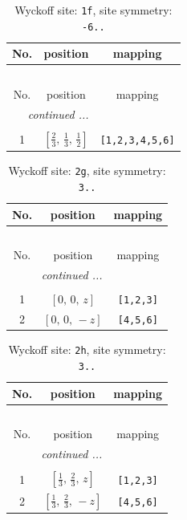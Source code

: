 \documentclass[fleqn,8pt]{jsarticle}
\begin{document}
\renewcommand{\arraystretch}{1.2}
\begin{longtable}{ccc}
\caption{Wyckoff site: {\tt 1f}, site symmetry: {\tt -6..}}
 \\
 \hline \hline
No. & position & mapping \\ \hline \endfirsthead

\multicolumn{2}{l}{\tablename\ \thetable{}} \\
 \hline \hline
No. & position & mapping \\ \hline \endhead

 \hline \hline
\multicolumn{2}{r}{\footnotesize\it continued ...} \\ \endfoot

 \hline \hline
\multicolumn{2}{r}{} \\ \endlastfoot

1 & $\left[ \frac{2}{3},\, \frac{1}{3},\, \frac{1}{2} \right]$ & {\tt [1,2,3,4,5,6]} \\
\end{longtable}
\renewcommand{\arraystretch}{1.2}
\begin{longtable}{ccc}
\caption{Wyckoff site: {\tt 2g}, site symmetry: {\tt 3..}}
 \\
 \hline \hline
No. & position & mapping \\ \hline \endfirsthead

\multicolumn{2}{l}{\tablename\ \thetable{}} \\
 \hline \hline
No. & position & mapping \\ \hline \endhead

 \hline \hline
\multicolumn{2}{r}{\footnotesize\it continued ...} \\ \endfoot

 \hline \hline
\multicolumn{2}{r}{} \\ \endlastfoot

1 & $\left[ 0,\, 0,\, z \right]$ & {\tt [1,2,3]} \\ \hline
2 & $\left[ 0,\, 0,\, - z \right]$ & {\tt [4,5,6]} \\
\end{longtable}
\renewcommand{\arraystretch}{1.2}
\begin{longtable}{ccc}
\caption{Wyckoff site: {\tt 2h}, site symmetry: {\tt 3..}}
 \\
 \hline \hline
No. & position & mapping \\ \hline \endfirsthead

\multicolumn{2}{l}{\tablename\ \thetable{}} \\
 \hline \hline
No. & position & mapping \\ \hline \endhead

 \hline \hline
\multicolumn{2}{r}{\footnotesize\it continued ...} \\ \endfoot

 \hline \hline
\multicolumn{2}{r}{} \\ \endlastfoot

1 & $\left[ \frac{1}{3},\, \frac{2}{3},\, z \right]$ & {\tt [1,2,3]} \\ \hline
2 & $\left[ \frac{1}{3},\, \frac{2}{3},\, - z \right]$ & {\tt [4,5,6]} \\
\end{longtable}
\end{document}
